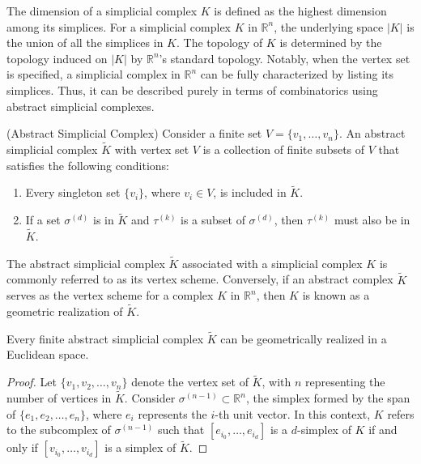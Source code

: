 The dimension of a simplicial complex $K$ is defined as the highest dimension among its simplices. For a simplicial complex $K$ in $\mathbb{R}^{n}$, the underlying space $\vert K \vert$ is the union of all the simplices in $K$. The topology of $K$ is determined by the topology induced on $\vert K \vert$ by $\mathbb{R}^{n}$'s standard topology. Notably, when the vertex set is specified, a simplicial complex in $\mathbb{R}^{n}$ can be fully characterized by listing its simplices. Thus, it can be described purely in terms of combinatorics using abstract simplicial complexes.

\begin{definition}
	{(Abstract Simplicial Complex) \cite[\S 2.3]{boissonnat2018geometric}} \label{abstractsimplicialcomplex}
	Consider a finite set $V = \{v_1, \ldots, v_n\}$. An abstract simplicial complex $\tilde{K}$ with vertex set $V$ is a collection of finite subsets of $V$ that satisfies the following conditions:
	\begin{enumerate}
		\item Every singleton set $\{v_i\}$, where $v_i \in V$, is included in $\tilde{K}$.
		\item If a set $\sigma^{(d)}$ is in $\tilde{K}$ and $\tau^{(k)}$ is a subset of $\sigma^{(d)}$, then $\tau^{(k)}$ must also be in $\tilde{K}$.
	\end{enumerate}
\end{definition}

The abstract simplicial complex $\tilde{K}$ associated with a simplicial complex $K$ is commonly referred to as its vertex scheme. Conversely, if an abstract complex $\tilde{K}$ serves as the vertex scheme for a complex $K$ in $\mathbb{R}^{n}$, then $K$ is known as a geometric realization of $\tilde{K}$.

\begin{proposition}
	Every finite abstract simplicial complex $\tilde{K}$ can be geometrically realized in a Euclidean space.
\end{proposition}

\begin{proof}
    Let $\{v_1, v_2, \ldots, v_n\}$ denote the vertex set of $\tilde{K}$, with $n$ representing the number of vertices in $\tilde{K}$. Consider $\sigma^{(n-1)} \subset \mathbb{R}^{n}$, the simplex formed by the span of $\{e_1, e_2, \ldots, e_n\}$, where $e_i$ represents the $i$-th unit vector. In this context, $K$ refers to the subcomplex of $\sigma^{(n-1)}$ such that $[e_{i_0}, \ldots, e_{i_d}]$ is a $d$-simplex of $K$ if and only if $[v_{i_0}, \ldots, v_{i_d}]$ is a simplex of $\tilde{K}$.
\end{proof}

